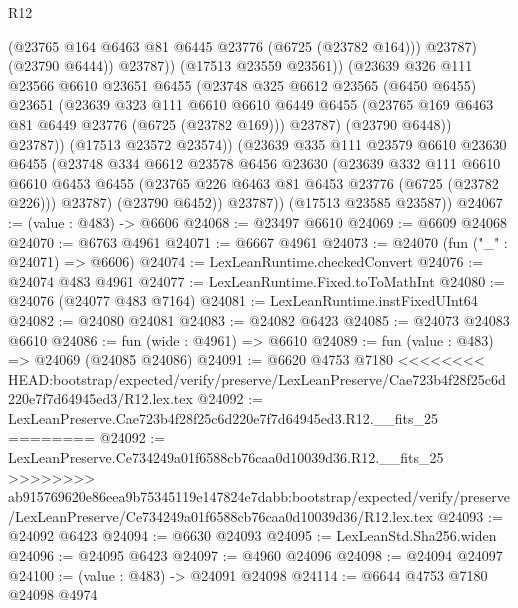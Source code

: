 \begin{lexlean}{R12}
\begin{coremodule}
{{{{{{{{{{{{{{{{{{{{{{{{{{{{{{{{{{{{{{{{{{{{{{{{{{{{{{{{{{{{{{{{{{{{{{{{{{{{{{{{{{                      (@23765 @164 @6463 @81 @6445 @23776 (@6725 (@23782 @164)))
                      @23787)
                    (@23790 @6444))
                  @23787))
              (@17513 @23559 @23561))
            (@23639
              @326
              @111
              @23566
              @6610
              @23651
              @6455
              (@23748
                @325
                @6612
                @23565
                (@6450 @6455)
                @23651
                (@23639
                  @323
                  @111
                  @6610
                  @6610
                  @6449
                  @6455
                  (@23765 @169 @6463 @81 @6449 @23776 (@6725 (@23782 @169)))
                  @23787)
                (@23790 @6448))
              @23787))
          (@17513 @23572 @23574))
        (@23639
          @335
          @111
          @23579
          @6610
          @23630
          @6455
          (@23748
            @334
            @6612
            @23578
            @6456
            @23630
            (@23639
              @332
              @111
              @6610
              @6610
              @6453
              @6455
              (@23765 @226 @6463 @81 @6453 @23776 (@6725 (@23782 @226)))
              @23787)
            (@23790 @6452))
          @23787))
      (@17513 @23585 @23587))
@24067 := (value : @483) -> @6606
@24068 := @23497 @6610
@24069 := @6609 @24068
@24070 := @6763 @4961
@24071 := @6667 @4961
@24073 := @24070 (fun ("_" : @24071) => @6606)
@24074 := LexLeanRuntime.checkedConvert
@24076 := @24074 @483 @4961
@24077 := LexLeanRuntime.Fixed.toToMathInt
@24080 := @24076 (@24077 @483 @7164)
@24081 := LexLeanRuntime.instFixedUInt64
@24082 := @24080 @24081
@24083 := @24082 @6423
@24085 := @24073 @24083 @6610
@24086 := fun (wide : @4961) => @6610
@24089 := fun (value : @483) => @24069 (@24085 @24086)
@24091 := @6620 @4753 @7180
<<<<<<<< HEAD:bootstrap/expected/verify/preserve/LexLeanPreserve/Cae723b4f28f25c6d220e7f7d64945ed3/R12.lex.tex
@24092 := LexLeanPreserve.Cae723b4f28f25c6d220e7f7d64945ed3.R12.__fits_25
========
@24092 := LexLeanPreserve.Ce734249a01f6588cb76caa0d10039d36.R12.__fits_25
>>>>>>>> ab915769620e86eea9b75345119e147824e7dabb:bootstrap/expected/verify/preserve/LexLeanPreserve/Ce734249a01f6588cb76caa0d10039d36/R12.lex.tex
@24093 := @24092 @6423
@24094 := @6630 @24093
@24095 := LexLeanStd.Sha256.widen
@24096 := @24095 @6423
@24097 := @4960 @24096
@24098 := @24094 @24097
@24100 := (value : @483) -> @24091 @24098
@24114 := @6644
    @4753
    @7180
    @24098
    @4974
}}}}}}}}}}}}}}}}}}}}}}}}}}}}}}}}}}}}}}}}}}}}}}}}}}}}}}}}}}}}}}}}}}}}}}}}}}}}}}}}}}
\end{coremodule}
\end{lexlean}
